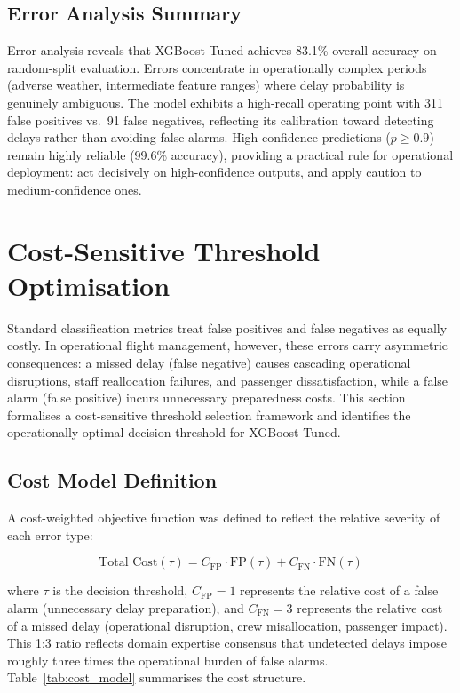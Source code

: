 \documentclass{report}
\begin{document}
\subsection{Error Analysis Summary}

Error analysis reveals that XGBoost Tuned achieves 83.1\% overall accuracy
on random-split evaluation.  Errors concentrate in operationally complex
periods (adverse weather, intermediate feature ranges) where delay
probability is genuinely ambiguous.  The model exhibits a high-recall
operating point with 311 false positives vs.\ 91 false negatives, reflecting
its calibration toward detecting delays rather than avoiding false alarms.
High-confidence predictions ($p \geq 0.9$) remain highly reliable (99.6\%
accuracy), providing a practical rule for operational deployment: act
decisively on high-confidence outputs, and apply caution to medium-confidence
ones.


\section{Cost-Sensitive Threshold Optimisation}
\label{sec:cost_threshold}
 
Standard classification metrics treat false positives and false negatives as
equally costly.  In operational flight management, however, these errors carry
asymmetric consequences: a missed delay (false negative) causes cascading
operational disruptions, staff reallocation failures, and passenger
dissatisfaction, while a false alarm (false positive) incurs unnecessary
preparedness costs.  This section formalises a cost-sensitive threshold
selection framework and identifies the operationally optimal decision
threshold for XGBoost Tuned.
 
\subsection{Cost Model Definition}
 
A cost-weighted objective function was defined to reflect the relative
severity of each error type:
 
\begin{equation}
  \text{Total Cost}(\tau) = C_{\mathrm{FP}} \cdot \mathrm{FP}(\tau)
    + C_{\mathrm{FN}} \cdot \mathrm{FN}(\tau)
  \label{eq:cost}
\end{equation}
 
where $\tau$ is the decision threshold, $C_{\mathrm{FP}} = 1$ represents
the relative cost of a false alarm (unnecessary delay preparation), and
$C_{\mathrm{FN}} = 3$ represents the relative cost of a missed delay
(operational disruption, crew misallocation, passenger impact).  This 1:3
ratio reflects domain expertise consensus that undetected delays impose
roughly three times the operational burden of false alarms.  Table~\ref{tab:cost_model}
summarises the cost structure.
 
\end{document}
